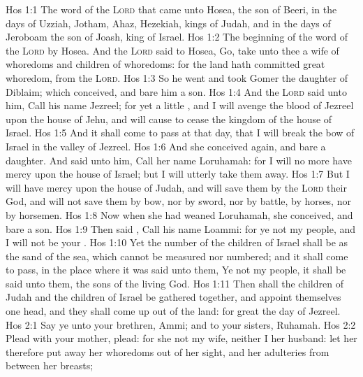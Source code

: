 \vs Hos 1:1 The word of the \textsc{Lord} that came unto Hosea, the son of Beeri, in the days of Uzziah, Jotham, Ahaz,  Hezekiah, kings of Judah, and in the days of Jeroboam the son of Joash, king of Israel.
\vs Hos 1:2 The beginning of the word of the \textsc{Lord} by Hosea. And the \textsc{Lord} said to Hosea, Go, take unto thee a wife of whoredoms and children of whoredoms: for the land hath committed great whoredom,  from the \textsc{Lord}.
\vs Hos 1:3 So he went and took Gomer the daughter of Diblaim; which conceived, and bare him a son.
\vs Hos 1:4 And the \textsc{Lord} said unto him, Call his name Jezreel; for yet a little , and I will avenge the blood of Jezreel upon the house of Jehu, and will cause to cease the kingdom of the house of Israel.
\vs Hos 1:5 And it shall come to pass at that day, that I will break the bow of Israel in the valley of Jezreel.
\vs Hos 1:6 And she conceived again, and bare a daughter. And  said unto him, Call her name Loruhamah: for I will no more have mercy upon the house of Israel; but I will utterly take them away.
\vs Hos 1:7 But I will have mercy upon the house of Judah, and will save them by the \textsc{Lord} their God, and will not save them by bow, nor by sword, nor by battle, by horses, nor by horsemen.
\vs Hos 1:8 Now when she had weaned Loruhamah, she conceived, and bare a son.
\vs Hos 1:9 Then said , Call his name Loammi: for ye  not my people, and I will not be your .
\vs Hos 1:10 Yet the number of the children of Israel shall be as the sand of the sea, which cannot be measured nor numbered; and it shall come to pass,  in the place where it was said unto them, Ye  not my people,  it shall be said unto them,  the sons of the living God.
\vs Hos 1:11 Then shall the children of Judah and the children of Israel be gathered together, and appoint themselves one head, and they shall come up out of the land: for great  the day of Jezreel.
\vs Hos 2:1 Say ye unto your brethren, Ammi; and to your sisters, Ruhamah.
\vs Hos 2:2 Plead with your mother, plead: for she  not my wife, neither  I her husband: let her therefore put away her whoredoms out of her sight, and her adulteries from between her breasts;
